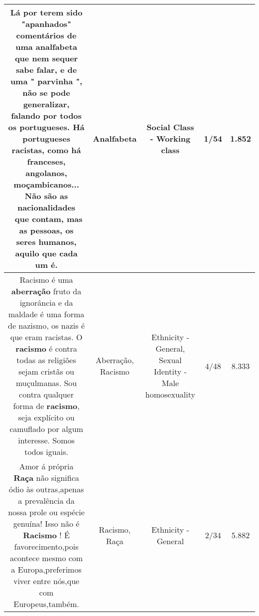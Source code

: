 \documentclass[11pt]{article}
\newlength\mylength
\begin{document}
\begin{center}
\begin{longtable}{|C{.65\mylength}|C{.30\mylength}|C{.12\mylength}|C{.12\mylength}|C{.12\mylength}|}
  \small Lá por terem sido "apanhados" comentários de uma \textbf{analfabeta} que nem sequer sabe falar, e de uma " parvinha ", não se pode generalizar, falando por todos os portugueses. Há portugueses racistas, como há franceses, angolanos, moçambicanos... Não são as nacionalidades  que contam, mas as pessoas, os seres humanos, aquilo que cada um é.\normalsize   & Analfabeta & Social Class - Working class & 1/54 & 1.852 \\  \hline
  \small Racismo é uma \textbf{aberração} fruto da ignorância e da maldade é uma forma de nazismo, os nazis é que eram racistas. O \textbf{racismo} é contra todas as religiões sejam cristãs ou muçulmanas. Sou contra qualquer forma de \textbf{racismo}, seja explícito ou camuflado por algum interesse. Somos todos iguais.\normalsize   & Aberração, Racismo & Ethnicity - General, Sexual Identity - Male homosexuality & 4/48 & 8.333 \\  \hline
  \small Amor á própria \textbf{Raça} não significa ódio às outras,apenas a prevalência da nossa prole ou espécie genuína! Isso não é \textbf{Racismo} ! É favorecimento,pois acontece mesmo com a Europa,preferimos viver entre nós,que com Europeus,também.\normalsize   & Racismo, Raça & Ethnicity - General & 2/34 & 5.882 \\  \hline

\end{longtable}
\end{center}
\end{document}
